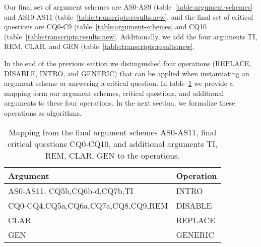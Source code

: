 Our final set of argument schemes are AS0-AS9 (table~\ref{table:argument-schemes} and AS10-AS11 (table~\ref{table:transcripts:results:new}, and the final set of critical questions are CQ0-C9 (table~\ref{table:argument-schemes} and CQ10 (table~\ref{table:transcripts:results:new}. Additionally, we add the four arguments TI, REM, CLAR, and GEN (table~\ref{table:transcripts:results:new}.

In the end of the previous section we distinguished four operations (REPLACE, DISABLE, INTRO, and GENERIC) that can be applied when instantiating an argument scheme or answering a critical question. In table~\ref{table:operation-mappings} we provide a mapping form our argument schemes, critical questions, and additional arguments to these four operations. In the next section, we formalize these operations as algorithms.

\begin{table}[ht]
\begin{tabular}{|l|l|}
\hline
\textbf{Argument} & \textbf{Operation}\\
\hline
AS0-AS11, CQ5b,CQ6b-d,CQ7b,TI& INTRO\\
\hline
CQ0-CQ4,CQ5a,CQ6a,CQ7a,CQ8,CQ9,REM & DISABLE\\
\hline
CLAR & REPLACE\\
\hline
GEN & GENERIC\\
\hline
\end{tabular}
\caption{Mapping from the final argument schemes AS0-AS11, final critical questions CQ0-CQ10, and additional arguments TI, REM, CLAR, GEN to the operations.}
\label{table:operation-mappings}
\end{table}